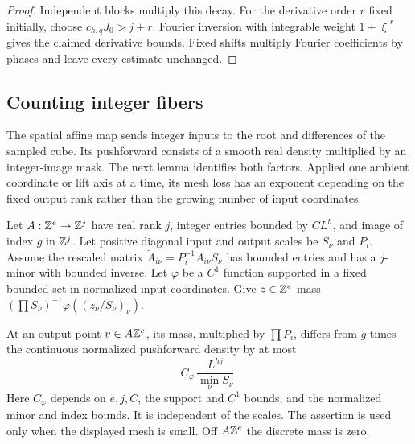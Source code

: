 \begin{proof}
Independent blocks multiply this decay. For the derivative
order $r$ fixed initially, choose $c_{h,q}J_0>j+r$.
Fourier inversion with integrable weight $1+|\xi|^r$
gives the claimed derivative bounds. Fixed shifts multiply
Fourier coefficients by phases and leave every estimate
unchanged.
\end{proof}

\subsection{Counting integer fibers}

The spatial affine map sends integer inputs to the root and
differences of the sampled cube. Its pushforward consists of a
smooth real density multiplied by an integer-image mask. The next
lemma identifies both factors. Applied one ambient coordinate or
lift axis at a time, its mesh loss has an exponent depending on
the fixed output rank rather than the growing number of input
coordinates.

\begin{lemma}
\label{cube:fiber}
Let $A:\mathbb Z^e\to\mathbb Z^j$ have real rank $j$, integer entries bounded by
$CL^h$, and image of index $g$ in $\mathbb Z^j$.  Let positive diagonal
input and output scales be $S_\nu$ and $P_i$.  Assume the rescaled
matrix $\widetilde A_{i\nu}=P_i^{-1}A_{i\nu}S_\nu$ has bounded
entries and has a $j$-minor with bounded inverse.  Let $\varphi$ be a
$C^1$ function supported in a fixed bounded set in normalized input
coordinates.  Give $z\in\mathbb Z^e$ mass
$(\prod S_\nu)^{-1}\varphi((z_\nu/S_\nu)_\nu)$.

At an output point $v\in A\mathbb Z^e$, its mass, multiplied by
$\prod P_i$, differs from $g$ times the continuous normalized
pushforward density by at most
\begin{equation}
 C_\varphi\,\frac{L^{hj}}{\min_\nu S_\nu}.
 \label{cube:fiber-error}
\end{equation}
Here $C_\varphi$ depends on $e,j,C$, the support and $C^1$ bounds,
and the normalized minor and index bounds.  It is independent of the
scales.  The assertion is used only when the displayed mesh is small.
Off $A\mathbb Z^e$ the discrete mass is zero.
\end{lemma}

